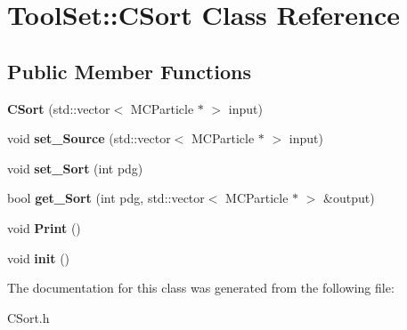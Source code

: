 \hypertarget{classToolSet_1_1CSort}{
\section{ToolSet::CSort Class Reference}
\label{classToolSet_1_1CSort}
}
\subsection*{Public Member Functions}
\begin{DoxyCompactItemize}
\item 
\hypertarget{classToolSet_1_1CSort_a560e39ec845cf80757fc8db8f2e6535c}{
{\bfseries CSort} (std::vector$<$ MCParticle $\ast$ $>$ input)}
\label{classToolSet_1_1CSort_a560e39ec845cf80757fc8db8f2e6535c}

\item 
\hypertarget{classToolSet_1_1CSort_aac195312a2398c41ea3ed23b1cf0bbbd}{
void {\bfseries set\_\-Source} (std::vector$<$ MCParticle $\ast$ $>$ input)}
\label{classToolSet_1_1CSort_aac195312a2398c41ea3ed23b1cf0bbbd}

\item 
\hypertarget{classToolSet_1_1CSort_a5f6171b80b6ecaf83bf2e60b4bdde7e7}{
void {\bfseries set\_\-Sort} (int pdg)}
\label{classToolSet_1_1CSort_a5f6171b80b6ecaf83bf2e60b4bdde7e7}

\item 
\hypertarget{classToolSet_1_1CSort_aad5168e62cb70e225aae8dc046c4a5f3}{
bool {\bfseries get\_\-Sort} (int pdg, std::vector$<$ MCParticle $\ast$ $>$ \&output)}
\label{classToolSet_1_1CSort_aad5168e62cb70e225aae8dc046c4a5f3}

\item 
\hypertarget{classToolSet_1_1CSort_a22dd3001dd0f38382d97ed3512ca37d9}{
void {\bfseries Print} ()}
\label{classToolSet_1_1CSort_a22dd3001dd0f38382d97ed3512ca37d9}

\item 
\hypertarget{classToolSet_1_1CSort_a41a2b93066428f3a286a62555bac3906}{
void {\bfseries init} ()}
\label{classToolSet_1_1CSort_a41a2b93066428f3a286a62555bac3906}

\end{DoxyCompactItemize}


The documentation for this class was generated from the following file:\begin{DoxyCompactItemize}
\item 
CSort.h\end{DoxyCompactItemize}
